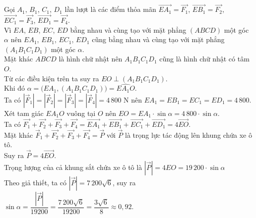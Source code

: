 \begin{ex}
{		Gọi $A_1$, $B_1$, $C_1$, $D_1$ lần lượt là các điểm thỏa mãn $\overrightarrow{EA_1}=\overrightarrow{F_1}$, $\overrightarrow{EB_1}=\overrightarrow{F_2}$, $\overrightarrow{EC_1}=\overrightarrow{F_3}$, $\overrightarrow{ED_1}=\overrightarrow{F_4}$.\\
		Vì $EA$, $EB$, $EC$, $ED$ bằng nhau và cùng tạo với mặt phẳng $(ABCD)$ một góc $\alpha$ nên $EA_1$, $EB_1$, $EC_1$, $ED_1$ cũng bằng nhau và cùng tạo với mặt phẳng $\left(A_1B_1C_1D_1\right)$ một góc $\alpha$.\\
		Mặt khác $ABCD$ là hình chữ nhật nên $A_1B_1C_1D_1$ cũng là hình chữ nhật có tâm $O$.\\
		Từ các điều kiện trên ta suy ra $EO\perp\left(A_1B_1C_1D_1\right)$. \\
		Khi đó $\alpha=\big(EA_1,\left(A_1B_1C_1D_1\right)\big)=\widehat{EA_1O}$.\\
		Ta có $\left|\overrightarrow{F}_1\right|=\left|\overrightarrow{F}_2\right|=\left|\overrightarrow{F}_3\right|=\left|\overrightarrow{F}_4\right|=4\,800$ N nên $EA_1=EB_1=EC_1=ED_1=4\,800$.\\
		Xét tam giác $EA_1O$ vuông tại $O$ nên $EO=EA_1\cdot \sin \alpha=4\,800\cdot \sin \alpha$.\\
		Ta có $\overrightarrow{F_1}+\overrightarrow{F_2}+\overrightarrow{F_3}+\overrightarrow{F_4}=\overrightarrow{EA_1}+\overrightarrow{EB_1}+\overrightarrow{EC_1}+\overrightarrow{ED_1}=4\overrightarrow{EO}$.\\
		Mặt khác $\overrightarrow{F}_1+\overrightarrow{F_2}+\overrightarrow{F_3}+\overrightarrow{F_4}=\overrightarrow{P}$ với $\overrightarrow{P}$ là trọng lực tác động lên khung chứa xe ô tô.\\
		Suy ra $\overrightarrow{P}=4\overrightarrow{EO}$.\\
		Trọng lượng của cả khung sắt chứa xe ô tô là $\left|\overrightarrow{P}\right|=4EO=19\,200\cdot \sin \alpha$\\
		Theo giả thiết, ta có $\left|\overrightarrow{P}\right|=7\,200\sqrt{6}$, suy ra $\sin \alpha=\dfrac{\left|\overrightarrow{P}\right|}{19200}=\dfrac{7\,200\sqrt{6}}{19200}=\dfrac{3\sqrt{6}}{8} \approx 0{,}92$.
	}
\end{ex}

